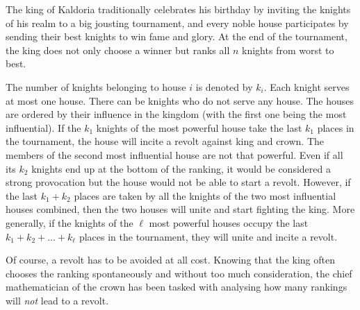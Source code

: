 

%
The king of Kaldoria traditionally celebrates his birthday by
inviting the knights of his realm to a big jousting tournament,
and every noble house participates by sending their best knights to win fame and glory.
At the end of the tournament, the king does not only choose a
winner but ranks all $n$ knights from worst to best.

The number of knights belonging to house $i$ is denoted by $k_i$.
Each knight serves at most one house.
There can be knights who do not serve any house.
The houses are ordered by their influence in the kingdom (with the first one being the most influential).
If the $k_1$ knights of the most powerful house take the last $k_1$ places in
the tournament, the house will incite a revolt against king and crown.
The members of the second most influential house are not that powerful.
Even if all its $k_2$ knights end up at the bottom of the ranking, it
would be considered a strong provocation but the house would not be able to start a revolt.
However, if the last $k_1 + k_2$ places are taken by all the
knights of the two most influential houses combined, then the two houses will unite
and start fighting the king.
More generally, if the knights of the $\ell$ most powerful
houses occupy the last $k_1 + k_2 + \dots
+ k_\ell$ places in the tournament, they will unite and incite a revolt.

Of course, a revolt has to be avoided at all cost. Knowing that the
king often chooses the ranking spontaneously and without too much
consideration, the chief mathematician of the crown has been tasked with analysing
how many rankings will \emph{not} lead to a revolt.

